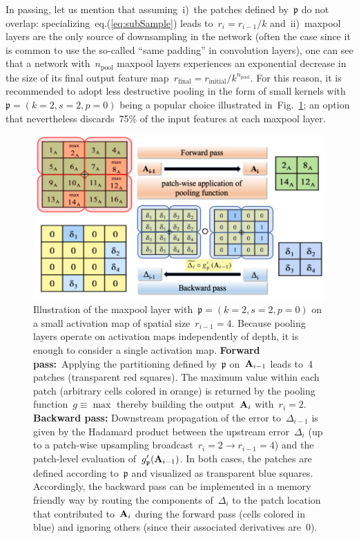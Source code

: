 \documentclass{article}
\begin{document}
\noindent In passing, let us mention that assuming~i)~the patches defined by~$\mathfrak{p}$ do not overlap: specializing~eq.(\ref{eq:subSample}) leads to~$r_i = r_{i-1} / k$ and~ii)~maxpool layers are the only source of downsampling in the network (often the case since it is common to use the so-called ``same padding'' in convolution layers), one can see that a network with~$n_\text{pool}$ maxpool layers experiences an exponential decrease in the size of its final output feature map~$r_\text{final} = r_\text{initial} / k^{n_\text{pool}}$.  For this reason, it is recommended to adopt less destructive pooling in the form of small kernels with~$\mathfrak{p} = \left(k=2, s=2, p=0 \right)$ being a popular choice illustrated in~Fig.~\ref{fig:maxPool}; an option that nevertheless discards~75$\%$ of the input features at each maxpool layer.

\begin{figure}[!ht]
\centering
\includegraphics[width=0.85\linewidth]{pptx/maxPool/Slide1.png}
\caption{Illustration of the maxpool layer with~$\mathfrak{p} = \left(k=2, s=2, p=0 \right)$ on a small activation map of spatial size~$r_{i-1} = 4$. Because pooling layers operate on activation maps independently of depth, it is enough to consider a single activation map. {\bf Forward pass:}~Applying the partitioning defined by~$\mathfrak{p}$ on~${\bf A}_{i-1}$ leads to~4 patches (transparent red squares).  The maximum value within each patch (arbitrary cells colored in orange) is returned by the pooling function~$g\equiv \max$ thereby building the output~${\bf A}_i$ with~$r_i=2$. {\bf Backward pass:} Downstream propagation of the error to~$\Delta_{i-1}$ is given by the Hadamard product between the upstream error~$\Delta_i$ (up to a patch-wise upsampling broadcast~$r_i=2 \rightarrow r_{i-1} = 4$) and the patch-level evaluation of~$g_\mathfrak{p}^\prime({\bf A}_{i-1})$.  In both cases, the patches are defined according to~$\mathfrak{p}$ and visualized as transparent blue squares. Accordingly, the backward pass can be implemented in a memory friendly way by routing the components of~$\Delta_i$ to the patch location that contributed to~${\bf A}_i$ during the forward pass (cells colored in blue) and ignoring others (since their associated derivatives are~0).}
\label{fig:maxPool}
\end{figure}
\end{document}
